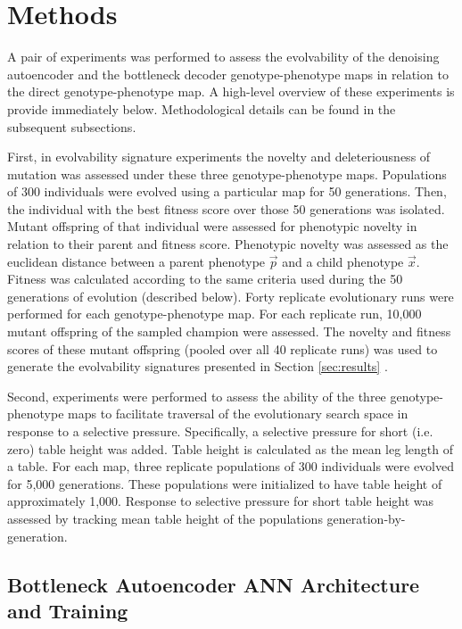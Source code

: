 \section{Methods} \label{sec:methods}

A pair of experiments was performed to assess the evolvability of the denoising autoencoder and the bottleneck decoder genotype-phenotype maps in relation to the direct genotype-phenotype map.
A high-level overview of these experiments is provide immediately below.
Methodological details can be found in the subsequent subsections.

First, in evolvability signature experiments the novelty and deleteriousness of mutation was assessed under these three genotype-phenotype maps.
Populations of 300 individuals were evolved using a particular map for 50 generations.
Then, the individual with the best fitness score over those 50 generations was isolated.
Mutant offspring of that individual were assessed for phenotypic novelty in relation to their parent and fitness score.
Phenotypic novelty was assessed as the euclidean distance between a parent phenotype $\vec{p}$ and a child phenotype $\vec{x}$.
Fitness was calculated according to the same criteria used during the 50 generations of evolution (described below).
Forty replicate evolutionary runs were performed for each genotype-phenotype map.
For each replicate run, 10,000 mutant offspring of the sampled champion were assessed.
The novelty and fitness scores of these mutant offspring (pooled over all 40 replicate runs) was used to generate the evolvability signatures presented in Section \ref{sec:results} \cite{tarapore2015evolvability}.

Second, experiments were performed to assess the ability of the three genotype-phenotype maps to facilitate traversal of the evolutionary search space in response to a selective pressure.
Specifically, a selective pressure for short (i.e. zero) table height was added.
Table height is calculated as the mean leg length of a table.
For each map, three replicate populations of 300 individuals were evolved for 5,000 generations.
These populations were initialized to have table height of approximately 1,000.
Response to selective pressure for short table height was assessed by tracking mean table height of the populations generation-by-generation.

\subsection{Bottleneck Autoencoder ANN Architecture and Training}

